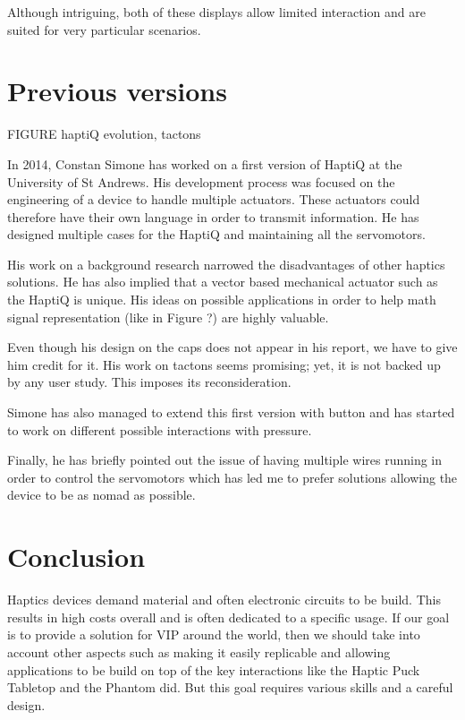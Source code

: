 Although intriguing, both of these displays allow limited interaction
and are suited for very particular scenarios.

\section{Previous versions}\label{previous-versions}

FIGURE haptiQ evolution, tactons

In 2014, Constan Simone has worked on a first version of HaptiQ at the
University of St Andrews. His development process was focused on the
engineering of a device to handle multiple actuators. These actuators
could therefore have their own language in order to transmit
information. He has designed multiple cases for the HaptiQ and
maintaining all the servomotors.

His work on a background research narrowed the disadvantages of other
haptics solutions. He has also implied that a vector based mechanical
actuator such as the HaptiQ is unique. His ideas on possible
applications in order to help math signal representation (like in Figure
?) are highly valuable.

Even though his design on the caps does not appear in his report, we
have to give him credit for it. His work on tactons seems promising;
yet, it is not backed up by any user study. This imposes its
reconsideration.

Simone has also managed to extend this first version with button and has
started to work on different possible interactions with pressure.

Finally, he has briefly pointed out the issue of having multiple wires
running in order to control the servomotors which has led me to prefer
solutions allowing the device to be as nomad as possible.

\section{Conclusion}\label{conclusion}

Haptics devices demand material and often electronic circuits to be
build. This results in high costs overall and is often dedicated to a
specific usage. If our goal is to provide a solution for VIP around the
world, then we should take into account other aspects such as making it
easily replicable and allowing applications to be build on top of the
key interactions like the Haptic Puck Tabletop and the Phantom did. But
this goal requires various skills and a careful design.

